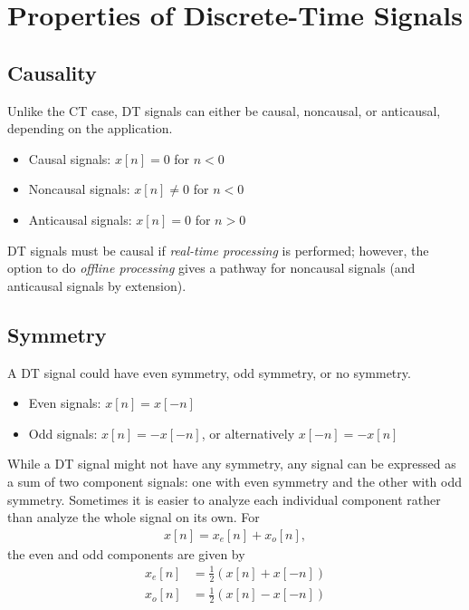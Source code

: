\documentclass{report}
\begin{document}
\section{Properties of Discrete-Time Signals}
\subsection{Causality}
Unlike the CT case, DT signals can either be causal, noncausal, or anticausal, depending on the application.
\begin{tcolorbox}[width=\textwidth,colback={white}, sharp corners]
    \begin{itemize}
        \item Causal signals: $x[n]=0$ for $n<0$
        \item Noncausal signals: $x[n]\neq 0$ for $n<0$
        \item Anticausal signals: $x[n]=0$ for $n>0$
    \end{itemize}
\end{tcolorbox}
DT signals must be causal if \emph{real-time processing} is performed; however, the option to do \emph{offline processing} gives a pathway for noncausal signals 
(and anticausal signals by extension). 

\subsection{Symmetry}
A DT signal could have even symmetry, odd symmetry, or no symmetry.
\begin{tcolorbox}[width=\textwidth,colback={white}, sharp corners]
    \begin{itemize}
        \item Even signals: $x[n]=x[-n]$
        \item Odd signals: $x[n]=-x[-n]$, or alternatively $x[-n]=-x[n]$
    \end{itemize}
\end{tcolorbox}
While a DT signal might not have any symmetry, any signal can be expressed as a sum of two component signals: one with even symmetry 
and the other with odd symmetry. Sometimes it is easier to analyze each individual component rather than analyze the whole signal on its own. For 
\begin{align}
    x[n] = x_e[n] + x_o[n],
\end{align}
the even and odd components are given by
\begin{align}
    x_e[n] &= \frac{1}{2}\left(x[n]+x[-n]\right) \\
    x_o[n] &= \frac{1}{2}\left(x[n]-x[-n]\right)
\end{align}
\end{document}
